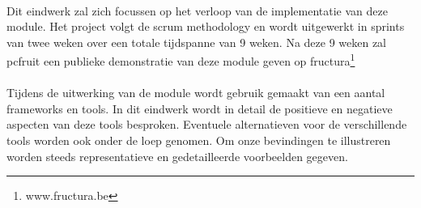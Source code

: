 \paragraph{}Dit eindwerk zal zich focussen op het verloop van de implementatie van deze module. Het project volgt de scrum methodology en wordt uitgewerkt in sprints van twee weken over een totale tijdspanne van 9 weken. Na deze 9 weken zal pcfruit een publieke demonstratie van deze module geven op fructura\footnote{www.fructura.be}
\paragraph{}Tijdens de uitwerking van de module wordt gebruik gemaakt van een aantal frameworks en tools. In dit eindwerk wordt in detail de positieve en negatieve aspecten van deze tools besproken. Eventuele alternatieven voor de verschillende tools worden ook onder de loep genomen. Om onze bevindingen te illustreren worden steeds representatieve en gedetailleerde voorbeelden gegeven.
